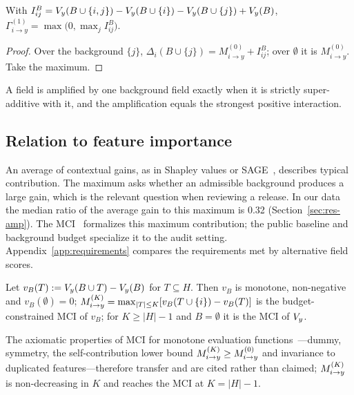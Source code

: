 \begin{proposition}[Amplification at $K=1$]\label{prop:k1}
With $I^B_{ij}=V_y(B\cup\{i,j\})-V_y(B\cup\{i\})-V_y(B\cup\{j\})+V_y(B)$,
$\Gamma^{(1)}_{i\to y}=\max\big(0,\max_{j} I^{B}_{ij}\big)$.
\end{proposition}
\begin{proof}
Over the background $\{j\}$, $\Delta_i(B\cup\{j\})=M^{(0)}_{i\to y}+I^B_{ij}$; over $\emptyset$ it is
$M^{(0)}_{i\to y}$. Take the maximum.
\end{proof}
A field is amplified by one background field exactly when it is strictly super-additive with it,
and the amplification equals the strongest positive interaction.

\subsection{Relation to feature importance}
An average of contextual gains, as in Shapley values or SAGE~\cite{covert2020sage}, describes typical contribution. The maximum asks whether an admissible background produces a large gain, which is the relevant question when reviewing a release. In our data the median ratio of the average gain to this maximum is 0.32 (Section~\ref{sec:res-amp}). The MCI~\cite{catav2021mci} formalizes this maximum contribution; the public baseline and background budget specialize it to the audit setting. Appendix~\ref{app:requirements} compares the requirements met by alternative field scores.

\begin{proposition}\label{prop:mci}
Let $v_B(T) := V_y(B \cup T) - V_y(B)$ for $T \subseteq H$. Then $v_B$ is monotone,
non-negative and $v_B(\emptyset)=0$; $M^{(K)}_{i\to y} = \max_{|T|\le K}[v_B(T\cup\{i\}) - v_B(T)]$ is the
budget-constrained MCI of $v_B$; for $K \ge |H|-1$ and $B=\emptyset$ it is the MCI of $V_y$.
\end{proposition}
The axiomatic properties of MCI for monotone evaluation functions~\cite{catav2021mci}---dummy,
symmetry, the self-contribution lower bound $M^{(K)}_{i\to y}\ge M^{(0)}_{i\to y}$ and invariance to
duplicated features---therefore transfer and are cited rather than claimed; $M^{(K)}_{i\to y}$ is
non-decreasing in $K$ and reaches the MCI at $K=|H|-1$.

